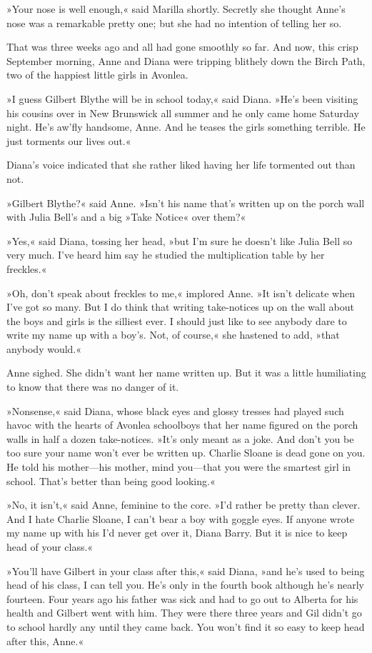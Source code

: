 »Your nose is well enough,« said Marilla shortly. Secretly she thought Anne's nose was a remarkable pretty one; but she had no intention of telling her so.

That was three weeks ago and all had gone smoothly so far. And now, this crisp September morning, Anne and Diana were tripping blithely down the Birch Path, two of the happiest little girls in Avonlea.

»I guess Gilbert Blythe will be in school today,« said Diana. »He's been visiting his cousins over in New Brunswick all summer and he only came home Saturday night. He's aw'fly handsome, Anne. And he teases the girls something terrible. He just torments our lives out.«

Diana's voice indicated that she rather liked having her life tormented out than not.

»Gilbert Blythe?« said Anne. »Isn't his name that's written up on the porch wall with Julia Bell's and a big »Take Notice« over them?«

»Yes,« said Diana, tossing her head, »but I'm sure he doesn't like Julia Bell so very much. I've heard him say he studied the multiplication table by her freckles.«

»Oh, don't speak about freckles to me,« implored Anne. »It isn't delicate when I've got so many. But I do think that writing take-notices up on the wall about the boys and girls is the silliest ever. I should just like to see anybody dare to write my name up with a boy's. Not, of course,« she hastened to add, »that anybody would.«

Anne sighed. She didn't want her name written up. But it was a little humiliating to know that there was no danger of it.

»Nonsense,« said Diana, whose black eyes and glossy tresses had played such havoc with the hearts of Avonlea schoolboys that her name figured on the porch walls in half a dozen take-notices. »It's only meant as a joke. And don't you be too sure your name won't ever be written up. Charlie Sloane is dead gone on you. He told his mother—his mother, mind you—that you were the smartest girl in school. That's better than being good looking.«

»No, it isn't,« said Anne, feminine to the core. »I'd rather be pretty than clever. And I hate Charlie Sloane, I can't bear a boy with goggle eyes. If anyone wrote my name up with his I'd never get over it, Diana Barry. But it is nice to keep head of your class.«

»You'll have Gilbert in your class after this,« said Diana, »and he's used to being head of his class, I can tell you. He's only in the fourth book although he's nearly fourteen. Four years ago his father was sick and had to go out to Alberta for his health and Gilbert went with him. They were there three years and Gil didn't go to school hardly any until they came back. You won't find it so easy to keep head after this, Anne.«

